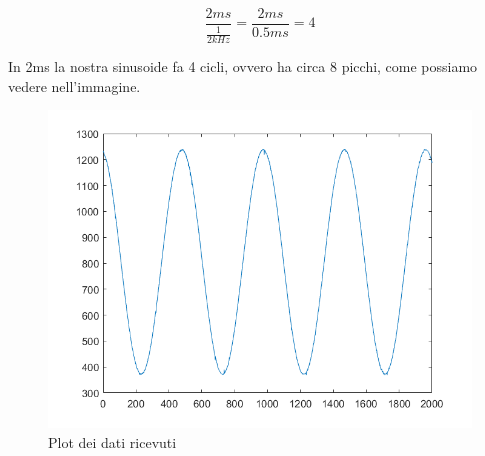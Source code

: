 \begin{displaymath}
 \frac{2 \si{ms}}{\frac {1}{2 \si{kHz}}}  = \frac{2 \si{ms}}{0.5\si{ms}} = 4
\end{displaymath}

In 2ms la nostra sinusoide fa 4 cicli, ovvero ha circa 8 picchi, come possiamo vedere nell'immagine.

\begin{figure}[H]
\centering
\includegraphics[width=\textwidth]{assets/exp6/onda_2kHz_8picchi.png}
\caption{Plot dei dati ricevuti}
\end{figure}